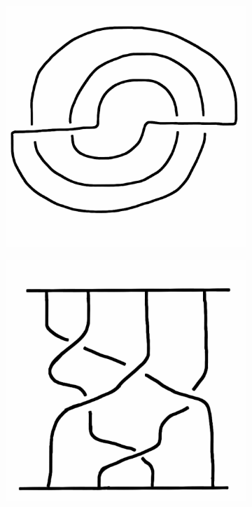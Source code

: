 \documentclass[12pt]{amsart}
\begin{document}
\begin{figure}[h!]
\begin{subfigure}[b]{0.2\textwidth}
\end{subfigure}\qquad
\begin{subfigure}[b]{0.2\textwidth}
\includegraphics[width=\textwidth]{images/twobridge.png}
\end{subfigure}\qquad
\begin{subfigure}[b]{0.2\textwidth}
\includegraphics[width=\textwidth]{images/braid.png}
\end{subfigure}
\end{figure}
\end{document}
